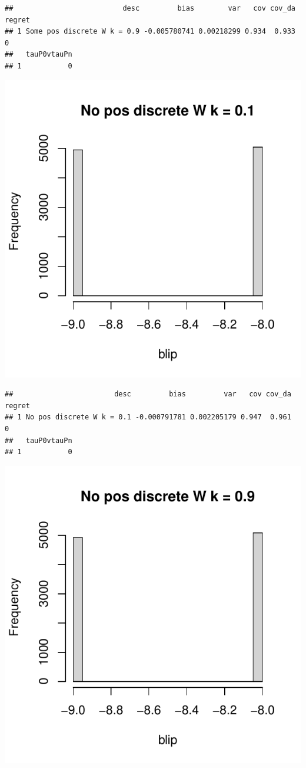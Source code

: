 \documentclass[11pt]{article}\usepackage[]{graphicx}\usepackage[table]{xcolor}
\makeatletter
\def\maxwidth{ %
  \ifdim\Gin@nat@width>\linewidth
    \linewidth
  \else
    \Gin@nat@width
  \fi
}
\newenvironment{kframe}{%
 \def\at@end@of@kframe{}%
 \ifinner\ifhmode%
  \def\at@end@of@kframe{\end{minipage}}%
  \begin{minipage}{\columnwidth}%
 \fi\fi%
 \def\FrameCommand##1{\hskip\@totalleftmargin \hskip-\fboxsep
 \colorbox{shadecolor}{##1}\hskip-\fboxsep
     \hskip-\linewidth \hskip-\@totalleftmargin \hskip\columnwidth}%
 \MakeFramed {\advance\hsize-\width
   \@totalleftmargin\z@ \linewidth\hsize
   \@setminipage}}%
 {\par\unskip\endMakeFramed%
 \at@end@of@kframe}
\newenvironment{knitrout}{}{} %
\makeatother
\begin{document}
\begin{knitrout}
\begin{kframe}\begin{verbatim}
##                          desc         bias        var   cov cov_da regret
## 1 Some pos discrete W k = 0.9 -0.005780741 0.00218299 0.934  0.933      0
##   tauP0vtauPn
## 1           0
\end{verbatim}
\end{kframe}
\includegraphics[width=\maxwidth]{figure/unnamed-chunk-4-5} 
\begin{kframe}\begin{verbatim}
##                        desc         bias         var   cov cov_da regret
## 1 No pos discrete W k = 0.1 -0.000791781 0.002205179 0.947  0.961      0
##   tauP0vtauPn
## 1           0
\end{verbatim}
\end{kframe}
\includegraphics[width=\maxwidth]{figure/unnamed-chunk-4-6} 

\end{knitrout}
\end{document}
